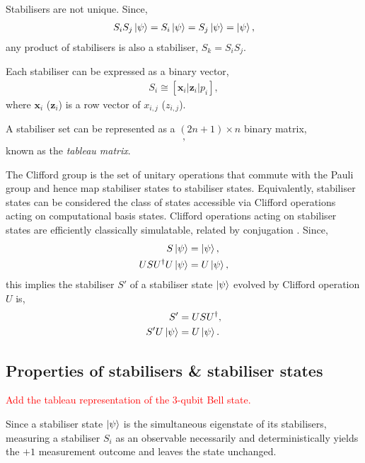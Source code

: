 \documentclass[twocolumn, aps, amsmath, amssymb, nofootinbib, superscriptaddress, longbibliography, doublefloatfix, table-of-contents, eqsecnum, rmp]{revtex4-2}
\begin{document}
Stabilisers are not unique. Since,
\begin{align}
	S_i S_j \ket\psi = S_i \ket\psi = S_j \ket\psi = \ket\psi,
\end{align}
any product of stabilisers is also a stabiliser, $S_k = S_i S_j$.

Each stabiliser can be expressed as a binary vector,
\begin{align}
	S_i \cong [\mathbf{x}_i | \mathbf{z}_i | p_i],
\end{align}
where $\mathbf{x}_i$ ($\mathbf{z}_i$) is a row vector of $x_{i,j}$ ($z_{i,j}$).

A stabiliser set can be represented as a $(2n+1)\times n$ binary matrix,
\begin{align}
	[\mathbf{X}|\mathbf{Z}|\mathbf{P}],
\end{align}
known as the \emph{tableau matrix}.

The Clifford group is the set of unitary operations that commute with the Pauli group and hence map stabiliser states to stabiliser states. Equivalently, stabiliser states can be considered the class of states accessible via Clifford operations acting on computational basis states. Clifford operations acting on stabiliser states are efficiently classically simulatable, related by conjugation \cite{gottesman1998heisenberg}. Since,
\begin{align}
	S\ket\psi &= \ket\psi, \nonumber\\
	USU^\dag U\ket\psi &= U\ket\psi,
\end{align}
this implies the stabiliser $S'$ of a stabiliser state $\ket\psi$ evolved by Clifford operation $U$ is,
\begin{align}
	S' &= USU^\dag,\nonumber\\
	S' U\ket\psi &= U\ket\psi.
\end{align}

\subsection{Properties of stabilisers \& stabiliser states}

\textcolor{red}{Add the tableau representation of the 3-qubit Bell state.}

Since a stabiliser state $\ket\psi$ is the simultaneous eigenstate of its stabilisers, measuring a stabiliser $S_i$ as an observable necessarily and deterministically yields the $+1$ measurement outcome and leaves the state unchanged.
\end{document}
